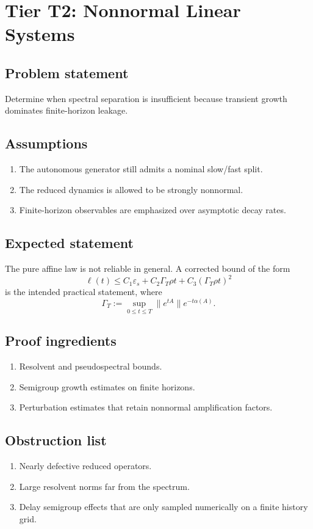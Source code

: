 \section{Tier T2: Nonnormal Linear Systems}

\subsection{Problem statement}
Determine when spectral separation is insufficient because transient growth dominates finite-horizon leakage.

\subsection{Assumptions}
\begin{enumerate}
\item The autonomous generator still admits a nominal slow/fast split.
\item The reduced dynamics is allowed to be strongly nonnormal.
\item Finite-horizon observables are emphasized over asymptotic decay rates.
\end{enumerate}

\subsection{Expected statement}
The pure affine law is not reliable in general. A corrected bound of the form
\[
\ell(t) \le C_1 \varepsilon_s + C_2 \Gamma_T \rho t + C_3 (\Gamma_T \rho t)^2
\]
is the intended practical statement, where
\[
\Gamma_T := \sup_{0 \le t \le T} \|e^{tA}\| e^{-t \alpha(A)}.
\]

\subsection{Proof ingredients}
\begin{enumerate}
\item Resolvent and pseudospectral bounds.
\item Semigroup growth estimates on finite horizons.
\item Perturbation estimates that retain nonnormal amplification factors.
\end{enumerate}

\subsection{Obstruction list}
\begin{enumerate}
\item Nearly defective reduced operators.
\item Large resolvent norms far from the spectrum.
\item Delay semigroup effects that are only sampled numerically on a finite history grid.
\end{enumerate}

